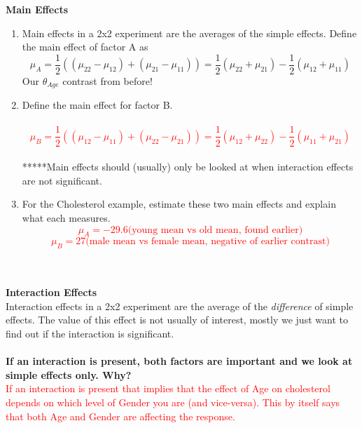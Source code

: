 \textbf{Main Effects}
\begin{enumerate}
\item Main effects in a 2x2 experiment are the averages of the simple effects.  Define the main effect of factor A as
$$\mu_{A}=\frac{1}{2}\left((\mu_{22}-\mu_{12})+(\mu_{21}-\mu_{11})\right)=\frac{1}{2}(\mu_{22}+\mu_{21})-\frac{1}{2}(\mu_{12}+\mu_{11})$$
Our $\theta_{Age}$ contrast from before!
\item Define the main effect for factor B.
\textcolor{red}{\\~\\
$$\mu_{B}=\frac{1}{2}\left((\mu_{12}-\mu_{11})+(\mu_{22}-\mu_{21})\right)=\frac{1}{2}(\mu_{12}+\mu_{22})-\frac{1}{2}(\mu_{11}+\mu_{21})$$~\\
}
*****Main effects should (usually) only be looked at when interaction effects are not significant.\\
\item For the Cholesterol example, estimate these two main effects and explain what each measures.
\textcolor{red}{\\
$$\mu_A=-29.6 \mbox{(young mean vs old mean, found earlier)}$$
$$\mu_B=27 \mbox{(male mean vs female mean, negative of earlier contrast)}$$}~\\~\\
\end{enumerate}

\textbf{Interaction Effects}\\
Interaction effects in a 2x2 experiment are the average of the \textit{difference} of simple effects.  The value of this effect is not usually of interest, mostly we just want to find out if the interaction is significant.\\~\\

\textbf{If an interaction is present, both factors are important and we look at simple effects only.  Why?}\\
\textcolor{red}{If an interaction is present that implies that the effect of Age on cholesterol depends on which level of Gender you are (and vice-versa).  This by itself says that both Age and Gender are affecting the response.}

